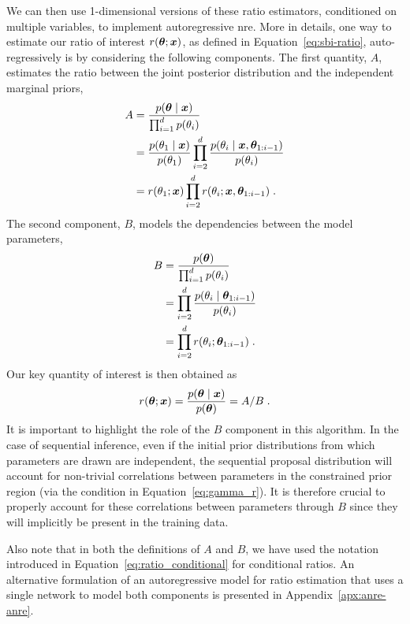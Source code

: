 We can then use 1-dimensional versions of these ratio estimators, conditioned on multiple variables, to implement autoregressive \gls*{nre}. More in details, one way to estimate our ratio of interest $r(\bm{\theta}; \bm{x})$, as defined in Equation~\eqref{eq:sbi-ratio}, auto-regressively is by considering the following components. The first quantity, $A$, estimates the ratio between the joint posterior distribution and the independent marginal priors,
\begin{equation} \label{eq:anre-A}
\begin{split}
    A &= 
    \frac{p(\bm{\theta}\mid \bm{x})}{\prod_{i=1}^d p(\theta_i)} \\
    & = \frac{p(\theta_1\mid \bm{x})}{p(\theta_1)} \prod_{i=2}^d \frac{p(\theta_i\mid \bm{x}, \bm{\theta}_{1:i-1})}{ p(\theta_i)} \\
    & = 
    r(\theta_1;\bm{x})  \prod_{i=2}^d  r(\theta_i;\bm{x}, \bm{\theta}_{1:i-1}) \;.
\end{split}
\end{equation}
The second component, $B$, models the dependencies between the model parameters,
\begin{equation} \label{eq:anre-B}
\begin{split}
    B &= 
    \frac{p(\bm{\theta})}{\prod_{i=1}^d p(\theta_i)} \\
    & = \prod_{i=2}^d \frac{p(\theta_i \mid \bm{\theta}_{1:i-1})}{p(\theta_i)} \\
    & = \prod_{i=2}^d r(\theta_i;\bm{\theta}_{1:i-1}) \;.
\end{split}
\end{equation}
Our key quantity of interest is then obtained as 
\begin{equation} \label{eq:anre-AB}
    r(\bm{\theta};\bm{x}) = \frac{p(\bm{\theta} \mid \bm{x})}{p(\bm{\theta})} = A/B \;.
\end{equation}
It is important to highlight the role of the $B$ component in this algorithm. In the case of sequential inference, even if the initial prior distributions from which parameters are drawn are independent, the sequential proposal distribution will account for non-trivial correlations between parameters in the constrained prior region (via the condition in Equation~\eqref{eq:gamma_r}). It is therefore crucial to properly account for these correlations between parameters through $B$ since they will implicitly be present in the training data. 

Also note that in both the definitions of $A$ and $B$, we have used the notation introduced in Equation~\eqref{eq:ratio_conditional} for conditional ratios. An alternative formulation of an autoregressive model for ratio estimation that uses a single network to model both components is presented in Appendix~\ref{apx:anre-anre}.

